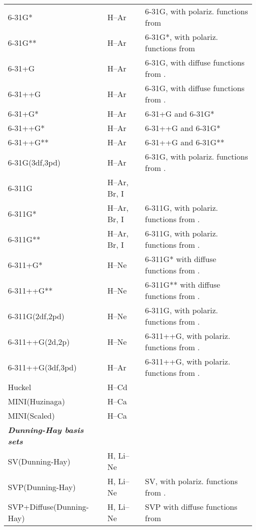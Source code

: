 \begin{longtable}{lll}
6-31G* & H--Ar & 6-31G, with polariz. functions from
  \cite{pchjaptca28,mmfwjpwjhjsbmsgdjdjapjcp77}\\
6-31G** & H--Ar  & 6-31G*, with polariz. functions from
  \cite{pchjaptca28}\\
6-31+G & H--Ar & 6-31G, with diffuse functions from
  \cite{tcjcgwsprsjcc4}.\\
6-31++G & H--Ar & 6-31G, with diffuse functions from
  \cite{tcjcgwsprsjcc4}.\\
6-31+G*   & H--Ar & 6-31+G and 6-31G*\\
6-31++G*  & H--Ar & 6-31++G and 6-31G*\\
6-31++G** & H--Ar & 6-31++G and 6-31G**\\
6-31G(3df,3pd) & H--Ar & 6-31G, with polariz. functions from
  \cite{mjfjapjsbjcp80}.\\
6-311G & H--Ar, Br, I & \cite{rkjsbrsjapjcp72,admgscjcp72,
   lacmpmjpbnedrcblrjcp103,mngapmpmlrjcp103}\\
6-311G* & H--Ar, Br, I & 6-311G, with polariz. functions from
  \cite{rkjsbrsjapjcp72,lacmpmjpbnedrcblrjcp103}.\\
6-311G** & H--Ar, Br, I & 6-311G, with polariz. functions from
  \cite{rkjsbrsjapjcp72,lacmpmjpbnedrcblrjcp103}.\\
6-311+G* & H--Ne & 6-311G* with diffuse functions from 
  \cite{tcjcgwsprsjcc4}.\\
6-311++G** & H--Ne & 6-311G** with diffuse functions from
  \cite{tcjcgwsprsjcc4}.\\
6-311G(2df,2pd) & H--Ne & 6-311G, with polariz. functions from
  \cite{mjfjapjsbjcp80}.\\
6-311++G(2d,2p) & H--Ne & 6-311++G, with polariz. functions from
  \cite{mjfjapjsbjcp80}.\\
6-311++G(3df,3pd) & H--Ar & 6-311++G, with polariz. functions from
  \cite{mjfjapjsbjcp80}.\\
\hline
%
Huckel & H--Cd & \\
MINI(Huzinaga) & H--Ca & \cite{huzinagabasis} \\
MINI(Scaled) & H--Ca & \cite{huzinagabasis,htshjcc1} \\
\hline
\newpage
%
\bf{\emph{Dunning-Hay basis sets}} & & \\
SV(Dunning-Hay) & H, Li--Ne & \cite{thdpjhhfs1977} \\
SVP(Dunning-Hay) & H, Li--Ne & SV, with polariz. functions from
  \cite{thdpjhhfs1977,emhfsjcp83}.\\
SVP+Diffuse(Dunning-Hay) & H, Li--Ne & SVP with diffuse functions from

\end{longtable}
